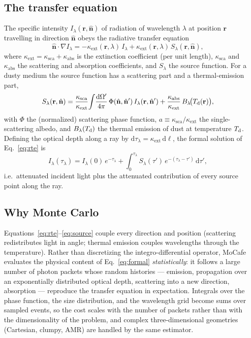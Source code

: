 \documentclass[english,a4paper]{kiseon_memo}
\newcommand{\kabs}{\kappa_{\mathrm{abs}}}
\newcommand{\kext}{\kappa_{\mathrm{ext}}}
\newcommand{\ksca}{\kappa_{\mathrm{sca}}}
\newcommand{\nhat}{\hat{\mathbf n}}
\newcommand{\rvec}{\mathbf r}
\newcommand{\dd}{\mathrm{d}}
\begin{document}
\subsection{The transfer equation}
The specific intensity $I_\lambda(\rvec,\nhat)$ of radiation of wavelength
$\lambda$ at position $\rvec$ travelling in direction $\nhat$ obeys the
radiative transfer equation
\begin{equation}
  \nhat\!\cdot\!\nabla I_\lambda
   = -\kext(\rvec,\lambda)\,I_\lambda
     + \kext(\rvec,\lambda)\,S_\lambda(\rvec,\nhat),
  \label{eq:rte}
\end{equation}
where $\kext=\ksca+\kabs$ is the extinction coefficient (per unit length),
$\ksca$ and $\kabs$ the scattering and absorption coefficients, and $S_\lambda$
the source function.  For a dusty medium the source function has a scattering
part and a thermal-emission part,
\begin{equation}
  S_\lambda(\rvec,\nhat)
   = \frac{\ksca}{\kext}\!\int\! \frac{\dd\Omega'}{4\pi}\,
       \Phi(\nhat,\nhat')\,I_\lambda(\rvec,\nhat')
   + \frac{\kabs}{\kext}\, B_\lambda\!\big(T_{\rm d}(\rvec)\big),
  \label{eq:source}
\end{equation}
with $\Phi$ the (normalized) scattering phase function, $a\equiv\ksca/\kext$ the
single-scattering albedo, and $B_\lambda(T_{\rm d})$ the thermal emission of dust
at temperature $T_{\rm d}$.  Defining the optical depth along a ray by
$\dd\tau_\lambda=\kext\,\dd\ell$, the formal solution of Eq.~\eqref{eq:rte} is
\begin{equation}
  I_\lambda(\tau_\lambda)= I_\lambda(0)\,e^{-\tau_\lambda}
     + \int_0^{\tau_\lambda}\!\! S_\lambda(\tau')\,e^{-(\tau_\lambda-\tau')}\,\dd\tau',
  \label{eq:formal}
\end{equation}
i.e.\ attenuated incident light plus the attenuated contribution of every source
point along the ray.

\subsection{Why Monte Carlo}
Equations~\eqref{eq:rte}--\eqref{eq:source} couple every direction and position
(scattering redistributes light in angle; thermal emission couples wavelengths
through the temperature).  Rather than discretizing the integro-differential
operator, MoCafe evaluates the physical content of Eq.~\eqref{eq:formal}
\emph{statistically}: it follows a large number of photon packets whose random
histories --- emission, propagation over an exponentially distributed optical
depth, scattering into a new direction, absorption --- reproduce the transfer
equation in expectation.  Integrals over the phase function, the size
distribution, and the wavelength grid become sums over sampled events, so the
cost scales with the number of packets rather than with the dimensionality of
the problem, and complex three-dimensional geometries (Cartesian, clumpy, AMR)
are handled by the same estimator.
\end{document}
